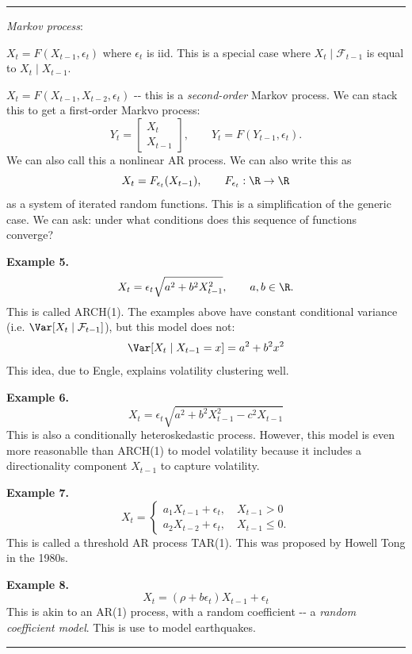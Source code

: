 \begin{center}\rule{0.5\linewidth}{0.5pt}\end{center}

\emph{Markov process}:

\(X_t = F(X_{t-1}, \epsilon_t)\) where \(\epsilon_t\) is iid. This is a special case where \(X_t \mid \mathcal{F}_{t-1}\) is equal to \(X_t \mid X_{t-1}\).

\(X_t = F(X_{t-1}, X_{t-2}, \epsilon_t)\) -\/- this is a \emph{second-order} Markov process. We can stack this to get a first-order Markvo process:
\[Y_t =
\begin{bmatrix}
X_t \\
X_{t-1}
\end{bmatrix}, \qquad Y_t = F(Y_{t-1}, \epsilon_t).\]
We can also call this a nonlinear AR process. We can also write this as
\[X_t = F_{\epsilon_t}(X_{t-1}), \qquad F_{\epsilon_t}: \R \to \R\]
as a system of iterated random functions. This is a simplification of the generic case. We can ask: under what conditions does this sequence of functions converge?

\textbf{Example 5.}
\[X_t = \epsilon_t \sqrt{a^2 + b^2 X_{t-1}^2}, \qquad a, b \in \R.\]
This is called ARCH(1). The examples above have constant conditional variance (i.e. \(\Var[X_t \mid \mathcal{F}_{t-1}]\)), but this model does not:
\[\Var[X_t \mid X_{t-1} = x] = a^2 + b^2 x^2\]
This idea, due to Engle, explains volatility clustering well.

\textbf{Example 6.}
\[X_t = \epsilon_t \sqrt{a^2 + b^2 X_{t-1}^2 - c^2 X_{t-1}}\]
This is also a conditionally heteroskedastic process. However, this model is even more reasonablle than ARCH(1) to model volatility because it includes a directionality component \(X_{t-1}\) to capture volatility.

\textbf{Example 7.}
\[X_t =
\begin{cases}
    a_1 X_{t-1} + \epsilon_t, \quad X_{t-1} > 0 \\
    a_2 X_{t-2} + \epsilon_t, \quad X_{t-1} \leq 0.
\end{cases}\]
This is called a threshold AR process TAR(1). This was proposed by Howell Tong in the 1980s.

\textbf{Example 8.}
\[X_t = (\rho + b \epsilon_t) X_{t-1} + \epsilon_t\]
This is akin to an AR(1) process, with a random coefficient -\/- a \emph{random coefficient model}. This is use to model earthquakes.

\begin{center}\rule{0.5\linewidth}{0.5pt}\end{center}

